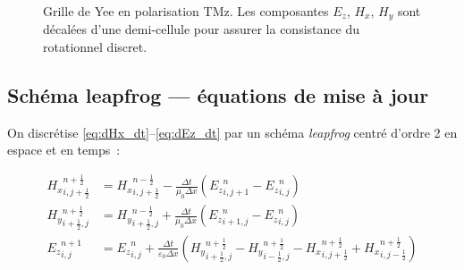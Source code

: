 \documentclass[12pt,a4paper]{article}
\newcommand{\Ez}{{E_z}}
\newcommand{\Hx}{{H_x}}
\newcommand{\Hy}{{H_y}}
\newcommand{\eps}{\varepsilon}
\newcommand{\dx}{\Delta x}
\newcommand{\dt}{\Delta t}
\newcommand{\half}{\tfrac{1}{2}}
\numberwithin{equation}{section}
\numberwithin{figure}{section}
\numberwithin{table}{section}
\begin{document}
\begin{figure}[h!]
\caption{Grille de Yee en polarisation TMz. Les composantes $\Ez$, $\Hx$, $\Hy$
sont décalées d'une demi-cellule pour assurer la consistance du rotationnel discret.}
\label{fig:yee_grid}
\end{figure}

\subsection{Schéma leapfrog --- équations de mise à jour}

On discrétise \eqref{eq:dHx_dt}--\eqref{eq:dEz_dt} par un schéma
\emph{leapfrog} centré d'ordre 2 en espace et en temps~:

\begin{align}
    {H_x}^{n+\half}_{i,j+\half} &= {H_x}^{n-\half}_{i,j+\half}
        - \frac{\dt}{\mu_0\dx}
        \left( {E_z}^n_{i,j+1} - {E_z}^n_{i,j} \right)
    \label{eq:update_Hx} \\
    {H_y}^{n+\half}_{i+\half,j} &= {H_y}^{n-\half}_{i+\half,j}
        + \frac{\dt}{\mu_0\dx}
        \left( {E_z}^n_{i+1,j} - {E_z}^n_{i,j} \right)
    \label{eq:update_Hy} \\
    {E_z}^{n+1}_{i,j} &= {E_z}^n_{i,j}
        + \frac{\dt}{\eps_0\dx}
        \left( {H_y}^{n+\half}_{i+\half,j} - {H_y}^{n+\half}_{i-\half,j}
               - {H_x}^{n+\half}_{i,j+\half} + {H_x}^{n+\half}_{i,j-\half} \right)
    \label{eq:update_Ez}
\end{align}
\end{document}

